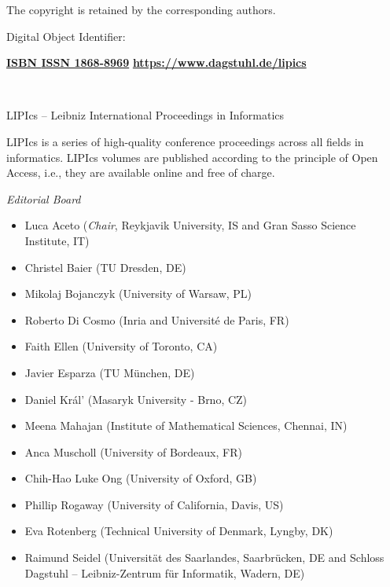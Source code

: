 \documentclass[a4paper,UKenglish]{lipicsmaster-v2021}
\begin{document}
\begin{publicationinfo}
\smallskip

The copyright is retained by the corresponding authors.

\bigskip
\bigskip
\bigskip
\bigskip

Digital Object Identifier: \href{https://doi.org/\printDOI}{\printDOI}

\vfill
\textbf{\href{https://www.dagstuhl.de/dagpub/\printISBN}{ISBN \printISBN}}\qquad \qquad \textbf{\href{https://www.dagstuhl.de/dagpub/1868-8969}{ISSN 1868-8969}}  \hfill \textbf{\href{https://www.dagstuhl.de/lipics}{https://www.dagstuhl.de/lipics}}


\newpage

\ \\
\bigskip
\bigskip
\bigskip

{\Large LIPIcs -- Leibniz International Proceedings in Informatics}

\bigskip

LIPIcs is a series of high-quality conference proceedings across all fields in informatics. 
LIPIcs volumes are published according to the principle of Open Access, i.e., they are available online and free of charge. 

\bigskip
\bigskip
\bigskip

\emph{Editorial Board}

\begin{itemize} 
\item Luca Aceto (\emph{Chair}, Reykjavik University, IS and Gran Sasso Science Institute, IT)
\item Christel Baier (TU Dresden, DE)
\item Mikolaj Bojanczyk (University of Warsaw, PL)
\item Roberto Di Cosmo (Inria and Universit\'e de Paris, FR)
\item Faith Ellen (University of Toronto, CA)
\item Javier Esparza (TU M\"unchen, DE)
\item Daniel Kr\'al' (Masaryk University - Brno, CZ)
\item Meena Mahajan (Institute of Mathematical Sciences, Chennai, IN)
\item Anca Muscholl (University of Bordeaux, FR)
\item Chih-Hao Luke Ong (University of Oxford, GB)
\item Phillip Rogaway (University of California, Davis, US)
\item Eva Rotenberg (Technical University of Denmark, Lyngby, DK)
\item Raimund Seidel  (Universit\"at des Saarlandes, Saarbr\"ucken, DE and Schloss Dagstuhl -- Leibniz-Zentrum f\"ur Informatik, Wadern, DE)
\end{itemize}



\end{publicationinfo}
\end{document}
